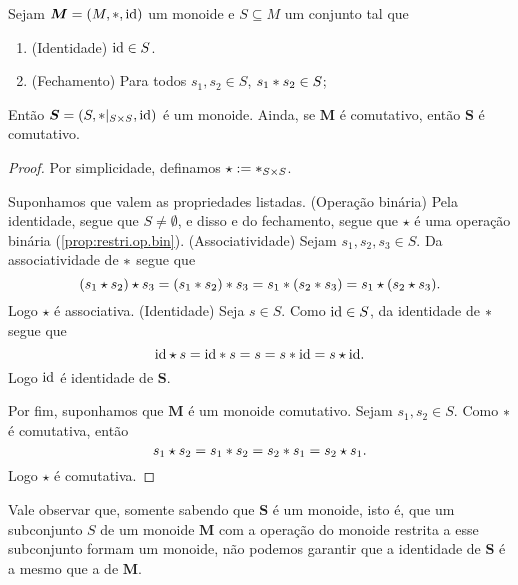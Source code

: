 \begin{prop}
\label{alge:prop.submon}
Sejam $\bm M=(M,\ast,\mathrm{id})$ um monoide e $S \subseteq M$ um conjunto tal que
	\begin{enumerate}
	\item (Identidade) $\mathrm{id} \in S$.
	\item (Fechamento) Para todos $s_1,s_2 \in S$, $s_1 \ast s_2 \in S$;
	\end{enumerate}
\noindent
Então $\bm S=(S,\ast|_{S \times S},\mathrm{id})$ é um monoide. Ainda, se $\bm M$ é comutativo, então $\bm S$ é comutativo.
\end{prop}
\begin{proof} Por simplicidade, definamos $\star :=  \ast _{S \times S}$.


Suponhamos que valem as propriedades listadas. (Operação binária) Pela identidade, segue que $S \neq \emptyset$, e disso e do fechamento, segue que $\star$ é uma operação binária (\ref{prop:restri.op.bin}).
(Associatividade) Sejam $s_1,s_2,s_3 \in S$. Da associatividade de $ \ast $ segue que
	\begin{equation*}
	 (s_1 \star s_2) \star s_3 = (s_1  \ast  s_2)  \ast  s_3 = s_1  \ast  (s_2  \ast  s_3) = s_1 \star (s_2 \star s_3).
	 \end{equation*}
Logo $\star$ é associativa. (Identidade) Seja $s \in S$. Como $\mathrm{id} \in S$, da identidade de $ \ast $ segue que
	\begin{equation*}
	\mathrm{id} \star s = \mathrm{id}  \ast  s = s = s \ast  \mathrm{id} = s \star \mathrm{id}.
	\end{equation*}
Logo $\mathrm{id}$ é identidade de $\bm S$.

Por fim, suponhamos que $\bm M$ é um monoide comutativo. Sejam $s_1,s_2 \in S$. Como $ \ast $ é comutativa, então
	\begin{equation*}
	s_1 \star s_2 = s_1  \ast  s_2 = s_2  \ast  s_1 = s_2 \star s_1.
	\end{equation*}
Logo $\star$ é comutativa.
\end{proof}

Vale observar que, somente sabendo que $\bm S$ é um monoide, isto é, que um subconjunto $S$ de um monoide $\bm M$ com a operação do monoide restrita a esse subconjunto formam um monoide, não podemos garantir que a identidade de $\bm S$ é a mesmo que a de $\bm M$.

